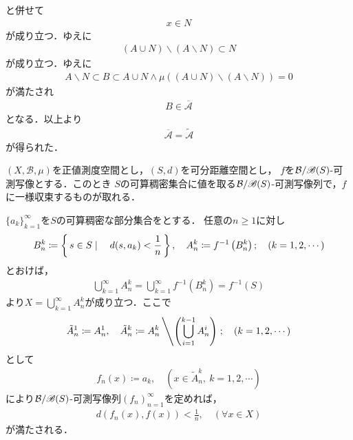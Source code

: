 \begin{sketch}
			と併せて
			\begin{align}
				x \in N
			\end{align}
			が成り立つ．ゆえに
			\begin{align}
				(A \cup N) \backslash (A \backslash N) \subset N
			\end{align}
			が成り立つ．ゆえに
			\begin{align}
				A \backslash N \subset B \subset A \cup N \wedge
				\mu\left( (A \cup N) \backslash (A \backslash N) \right) = 0
			\end{align}
			が満たされ
			\begin{align}
				B \in \overline{\mathscr{A}}
			\end{align}
			となる．以上より
			\begin{align}
				\overline{\mathscr{A}} = \tilde{\mathscr{A}}
			\end{align}
			が得られた．
			\QED
		\end{sketch}
		
		\begin{screen}
			\begin{lem}[可分値写像による可測写像の一様近似]\label{lem:approximation_of_countably_valued_mappings_on_dist_space}
				$(X,\mathcal{B},\mu)$を正値測度空間とし，$(S,d)$を可分距離空間とし，
				$f$を$\mathcal{B}/\mathscr{B}(S)$-可測写像とする．このとき
				$S$の可算稠密集合に値を取る$\mathcal{B}/\mathscr{B}(S)$-可測写像列で，$f$に一様収束するものが取れる．
			\end{lem}
		\end{screen}
		
		\begin{prf}
			$\{a_k\}_{k=1}^\infty$を$S$の可算稠密な部分集合をとする．
			任意の$n \geq 1$に対し
			\begin{align}
				B_n^k \coloneqq \left\{\, s \in S \mid \quad d(s,a_k) < \frac{1}{n}\, \right\},
				\quad A_n^k \coloneqq f^{-1}\left( B_n^k \right);
				\quad (k=1,2,\cdots)
			\end{align}
			とおけば，
			\begin{align}
				\bigcup_{k=1}^\infty A_n^k 
				= \bigcup_{k=1}^\infty f^{-1}\left( B_n^k \right)
				= f^{-1}(S)
			\end{align}
			より$X = \bigcup_{k=1}^\infty A_n^k$が成り立つ．ここで
			\begin{align}
				\tilde{A}_n^1 \coloneqq A_n^1,
				\quad \tilde{A}_n^k \coloneqq A_n^k \left\backslash \Biggl( \bigcup_{i=1}^{k-1} A_n^i \Biggr)\right.;
				\quad (k=1,2,\cdots)
			\end{align}
			として
			\begin{align}
				 f_n(x) \coloneqq a_k, \quad (x \in \tilde{A}_n^k,\ k=1,2,\cdots)
			\end{align}
			により$\mathcal{B}/\mathscr{B}(S)$-可測写像列$(f_n)_{n=1}^\infty$を定めれば，
			\begin{align}
				d\left(f_n(x),f(x)\right) < \frac{1}{n},
				\quad (\forall x \in X)
			\end{align}
			が満たされる．
			\QED
		\end{prf}
		
